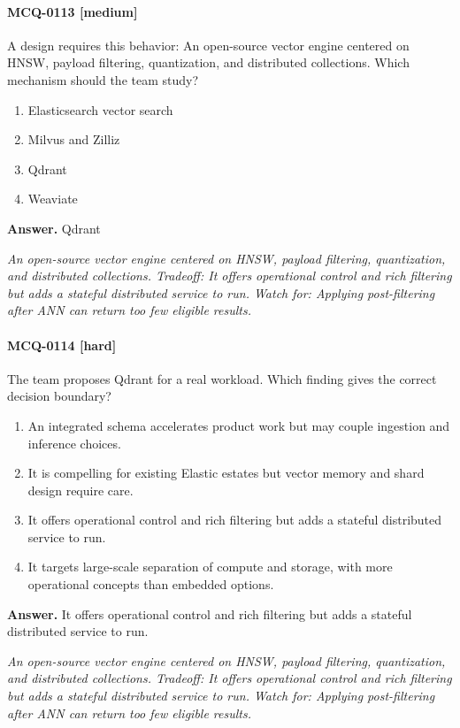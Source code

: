 \paragraph{MCQ-0113 [medium]} A design requires this behavior: An open-source vector engine centered on HNSW, payload filtering, quantization, and distributed collections. Which mechanism should the team study?
\begin{enumerate}[label=\Alph*.]
\item Elasticsearch vector search
\item Milvus and Zilliz
\item Qdrant
\item Weaviate
\end{enumerate}
\noindent\textbf{Answer.} Qdrant
\par\textit{An open-source vector engine centered on HNSW, payload filtering, quantization, and distributed collections. Tradeoff: It offers operational control and rich filtering but adds a stateful distributed service to run. Watch for: Applying post-filtering after ANN can return too few eligible results.}
\paragraph{MCQ-0114 [hard]} The team proposes Qdrant for a real workload. Which finding gives the correct decision boundary?
\begin{enumerate}[label=\Alph*.]
\item An integrated schema accelerates product work but may couple ingestion and inference choices.
\item It is compelling for existing Elastic estates but vector memory and shard design require care.
\item It offers operational control and rich filtering but adds a stateful distributed service to run.
\item It targets large-scale separation of compute and storage, with more operational concepts than embedded options.
\end{enumerate}
\noindent\textbf{Answer.} It offers operational control and rich filtering but adds a stateful distributed service to run.
\par\textit{An open-source vector engine centered on HNSW, payload filtering, quantization, and distributed collections. Tradeoff: It offers operational control and rich filtering but adds a stateful distributed service to run. Watch for: Applying post-filtering after ANN can return too few eligible results.}
